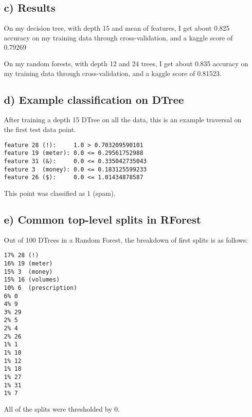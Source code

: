 \documentclass{article}
\begin{document}
\subsection{c) Results}\label{c-results}

On my decision tree, with depth 15 and mean of features, I get about
0.825 accuracy on my training data through cross-validation, and a
kaggle score of 0.79269

On my random forests, with depth 12 and 24 trees, I get about 0.835
accuracy on my training data through cross-validation, and a kaggle
score of 0.81523.

\subsection{d) Example classification on
DTree}\label{d-example-classification-on-dtree}

After training a depth 15 DTree on all the data, this is an example
traversal on the first test data point.

\begin{verbatim}
feature 28 (!):     1.0 > 0.703209590101
feature 19 (meter): 0.0 <= 0.29561752988
feature 31 (&):     0.0 <= 0.335042735043
feature 3  (money): 0.0 <= 0.183125599233
feature 26 ($):     0.0 <= 1.01434878587
\end{verbatim}

This point was classified as 1 (spam).

\subsection{e) Common top-level splits in
RForest}\label{e-common-top-level-splits-in-rforest}

Out of 100 DTrees in a Random Forest, the breakdown of first splits is
as follows:

\begin{verbatim}
17% 28 (!)
16% 19 (meter)
15% 3  (money)
15% 16 (volumes)
10% 6  (prescription)
6% 0
4% 9
3% 29
2% 5
2% 4
2% 26
1% 1
1% 10
1% 12
1% 18
1% 27
1% 31
1% 7
\end{verbatim}

All of the splits were thresholded by 0.
\end{document}
